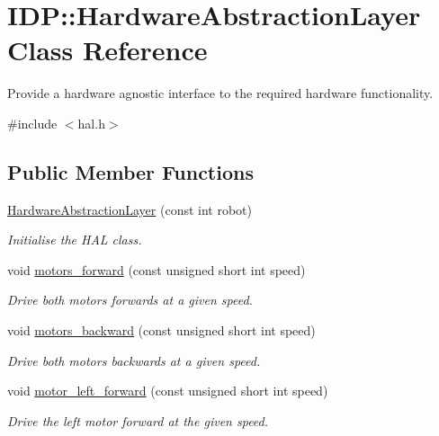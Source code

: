 \hypertarget{classIDP_1_1HardwareAbstractionLayer}{
\section{IDP::HardwareAbstractionLayer Class Reference}
\label{classIDP_1_1HardwareAbstractionLayer}
}


Provide a hardware agnostic interface to the required hardware functionality.  




{\ttfamily \#include $<$hal.h$>$}

\subsection*{Public Member Functions}
\begin{DoxyCompactItemize}
\item 
\hyperlink{classIDP_1_1HardwareAbstractionLayer_a424d40bbaed459f571b46dbb45bb8576}{HardwareAbstractionLayer} (const int robot)
\begin{DoxyCompactList}\small\item\em Initialise the HAL class. \item\end{DoxyCompactList}\item 
void \hyperlink{classIDP_1_1HardwareAbstractionLayer_a300956b0e2e9f67e7f10baf036bf8616}{motors\_\-forward} (const unsigned short int speed)
\begin{DoxyCompactList}\small\item\em Drive both motors forwards at a given speed. \item\end{DoxyCompactList}\item 
void \hyperlink{classIDP_1_1HardwareAbstractionLayer_ac81fbf6aa2bb93837ed276c47556a398}{motors\_\-backward} (const unsigned short int speed)
\begin{DoxyCompactList}\small\item\em Drive both motors backwards at a given speed. \item\end{DoxyCompactList}\item 
void \hyperlink{classIDP_1_1HardwareAbstractionLayer_acf3d3dd4e05c4b50cb31b4d35f21abbf}{motor\_\-left\_\-forward} (const unsigned short int speed)
\begin{DoxyCompactList}\small\item\em Drive the left motor forward at the given speed. \item\end{DoxyCompactList}\item 

\end{DoxyCompactItemize}
